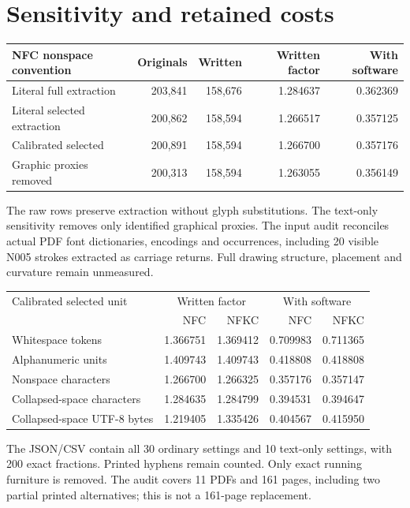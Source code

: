 \documentclass[11pt,a4paper]{article}
\begin{document}
\section*{Sensitivity and retained costs}
\begin{center}\begin{tabular}{lrrrr}\toprule
NFC nonspace convention & Originals & Written & Written factor & With software\\\midrule
Literal full extraction & 203,841 & 158,676 & 1.284637 & 0.362369\\
Literal selected extraction & 200,862 & 158,594 & 1.266517 & 0.357125\\
Calibrated selected & 200,891 & 158,594 & 1.266700 & 0.357176\\
Graphic proxies removed & 200,313 & 158,594 & 1.263055 & 0.356149\\\bottomrule
\end{tabular}\end{center}
The raw rows preserve extraction without glyph substitutions. The text-only sensitivity removes only identified graphical proxies. The input audit reconciles actual PDF font dictionaries, encodings and occurrences, including 20 visible N005 strokes extracted as carriage returns. Full drawing structure, placement and curvature remain unmeasured.

\begin{center}\begin{tabular}{lrrrr}\toprule
Calibrated selected unit & \multicolumn{2}{c}{Written factor} & \multicolumn{2}{c}{With software}\\
& NFC & NFKC & NFC & NFKC\\\midrule
Whitespace tokens & 1.366751 & 1.369412 & 0.709983 & 0.711365\\
Alphanumeric units & 1.409743 & 1.409743 & 0.418808 & 0.418808\\
Nonspace characters & 1.266700 & 1.266325 & 0.357176 & 0.357147\\
Collapsed-space characters & 1.284635 & 1.284799 & 0.394531 & 0.394647\\
Collapsed-space UTF-8 bytes & 1.219405 & 1.335426 & 0.404567 & 0.415950\\\bottomrule
\end{tabular}\end{center}
The JSON/CSV contain all 30 ordinary settings and 10 text-only settings, with 200 exact fractions. Printed hyphens remain counted. Only exact running furniture is removed. The audit covers 11 PDFs and 161 pages, including two partial printed alternatives; this is not a 161-page replacement.
\end{document}
